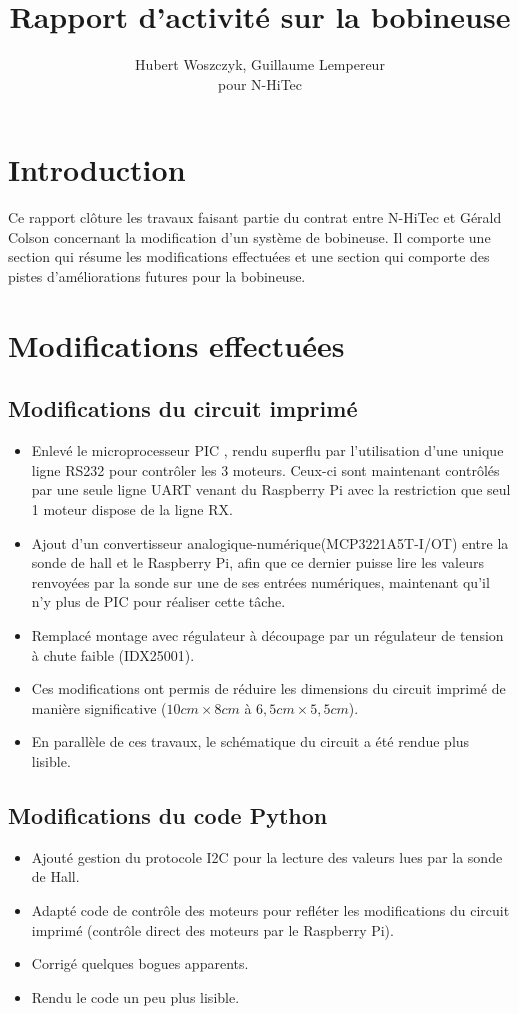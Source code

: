 \documentclass[12pt,a4paper]{article}
\author{Hubert Woszczyk, Guillaume Lempereur\\ pour N-HiTec}
\title{Rapport d'activité sur la bobineuse}
\begin{document}
\maketitle
\section*{Introduction}
Ce rapport clôture les travaux faisant partie du contrat entre N-HiTec et Gérald Colson concernant la modification d'un système de bobineuse. Il comporte une section qui résume les modifications effectuées et une section qui comporte des pistes d'améliorations futures pour la bobineuse.
 
\section{Modifications effectuées}
\subsection{Modifications du circuit imprimé}
\begin{itemize}\itemsep=6pt
\item Enlevé le microprocesseur PIC , rendu superflu par l'utilisation d'une unique ligne RS232 pour contrôler les 3 moteurs. Ceux-ci sont maintenant contrôlés par une seule ligne UART venant du Raspberry Pi avec la restriction que seul 1 moteur dispose de la ligne RX.
\item Ajout d'un convertisseur analogique-numérique(MCP3221A5T-I/OT) entre la sonde de hall et le Raspberry Pi, afin que ce dernier puisse lire les valeurs renvoyées par la sonde sur une de ses entrées numériques, maintenant qu'il n'y plus de PIC pour réaliser cette tâche.
\item Remplacé montage avec régulateur à découpage par un régulateur de tension à chute faible (IDX25001).
\item Ces modifications ont permis de réduire les dimensions du circuit imprimé de manière significative ($10cm \times 8cm$ à $6,5 cm\times 5,5 cm$).
\item En parallèle de ces travaux, le schématique du circuit a été rendue plus lisible.
\end{itemize}

\subsection{Modifications du code Python}
\begin{itemize}\itemsep=6pt
\item Ajouté gestion du protocole I2C pour la lecture des valeurs lues par la sonde de Hall.
\item Adapté code de contrôle des moteurs pour refléter les modifications du circuit imprimé (contrôle direct des moteurs par le Raspberry Pi).
\item Corrigé quelques bogues apparents.
\item Rendu le code un peu plus lisible.
\end{itemize}
\end{document}
